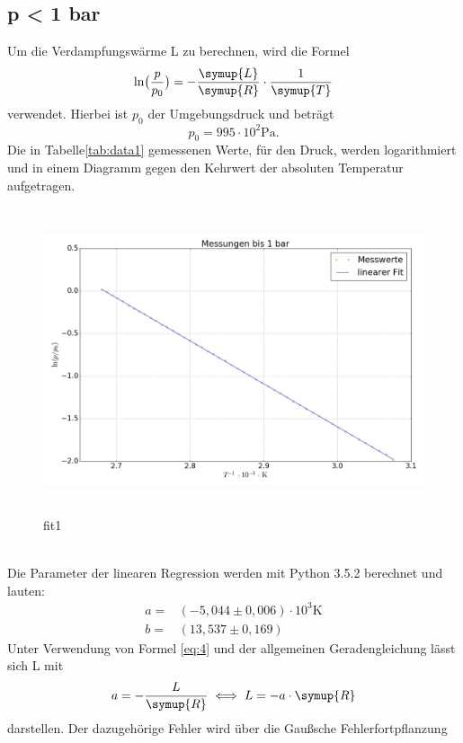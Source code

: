 \subsection{p < 1 bar}
Um die Verdampfungswärme L zu berechnen, wird die Formel
\begin{equation*}
  \ln \bigl(\frac{p}{p_0}\bigr)=-\frac{\symup{L}}{\symup{R}} \cdot \frac{1}{\symup{T}}
\end{equation*}
verwendet. Hierbei ist $p_0$ der Umgebungsdruck und beträgt
\begin{equation*}
  p_0=995\cdot 10^2 \si{\pascal}.
\end{equation*}
Die in Tabelle\ref{tab:data1} gemessenen Werte, für den Druck, werden logarithmiert und in einem
Diagramm gegen den Kehrwert der absoluten Temperatur aufgetragen. \\
 
\begin{figure}
  \centering
  \includegraphics[height=9cm , width=13.5cm]{fit1.jpg}
  \caption{fit1}
  \label{fig:fit1}
  \end{figure}
  \\
Die Parameter der linearen Regression werden mit Python 3.5.2 berechnet und
lauten:
\begin{align*}
  a =& (-5,044 \pm 0,006) \cdot 10^3 \si{\kelvin} \\
  b =& (13,537 \pm 0,169)
\end{align*}
Unter Verwendung von Formel \eqref{eq:4} und der allgemeinen Geradengleichung
lässt sich L mit
\begin{equation}
  a=-\frac{L}{\symup{R}} \iff L = -a \cdot \symup{R}
\end{equation}
darstellen. Der dazugehörige Fehler wird über die Gaußsche Fehlerfortpflanzung
